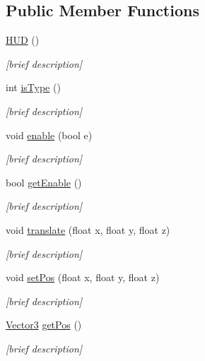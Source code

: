 \subsection*{Public Member Functions}
\begin{DoxyCompactItemize}
\item 
\hyperlink{class_h_u_d_a568b8ee1591f9ba3ed36ae05966f6b56}{H\-U\-D} ()
\begin{DoxyCompactList}\small\item\em \mbox{[}brief description\mbox{]} \end{DoxyCompactList}\item 
int \hyperlink{class_h_u_d_a1f1b15d877fedfb447a0196bc26f150a}{is\-Type} ()
\begin{DoxyCompactList}\small\item\em \mbox{[}brief description\mbox{]} \end{DoxyCompactList}\item 
void \hyperlink{class_h_u_d_a680aa1c6c3562e75d8992e98c760c396}{enable} (bool e)
\begin{DoxyCompactList}\small\item\em \mbox{[}brief description\mbox{]} \end{DoxyCompactList}\item 
bool \hyperlink{class_h_u_d_a6a5223de11b980f618c1d668ba1e251e}{get\-Enable} ()
\begin{DoxyCompactList}\small\item\em \mbox{[}brief description\mbox{]} \end{DoxyCompactList}\item 
void \hyperlink{class_h_u_d_a6bb647684d8c30cfa1e663549da37496}{translate} (float x, float y, float z)
\begin{DoxyCompactList}\small\item\em \mbox{[}brief description\mbox{]} \end{DoxyCompactList}\item 
void \hyperlink{class_h_u_d_a798eafd1edc326512a5dee73a09fd031}{set\-Pos} (float x, float y, float z)
\begin{DoxyCompactList}\small\item\em \mbox{[}brief description\mbox{]} \end{DoxyCompactList}\item 
\hyperlink{struct_vector3}{Vector3} \hyperlink{class_h_u_d_a4894b3dfc5a21277a39466624fc3b820}{get\-Pos} ()
\begin{DoxyCompactList}\small\item\em \mbox{[}brief description\mbox{]} \end{DoxyCompactList}\item 

\end{DoxyCompactItemize}

